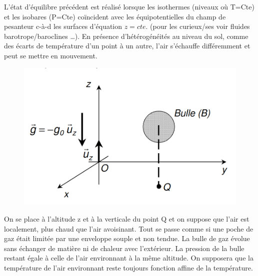 \documentclass[letterpaper]{article}
\begin{document}
L'état d'équilibre précédent est réalisé lorsque les isothermes (niveaux où T=Cte) et les isobares (P=Cte) coïncident avec les équipotentielles du champ de pesanteur c-à-d les surfaces d'équation \(z = cte\). (pour les curieux/ses voir fluides barotrope/baroclines \ldots{}). En présence d’hétérogénéités au niveau du sol, comme des écarts de température d'un point à un autre, l'air s'échauffe différemment et peut se mettre en mouvement.

\bigskip

\begin{figure}[htbp]
\centering
\includegraphics[width=.9\linewidth]{./Ex2a.png}
\end{figure}


On se place à l'altitude z et à la verticale du point Q et on suppose que l'air est localement, plus chaud que l'air avoisinant. Tout se passe comme si une poche de gaz était limitée par une enveloppe souple et non tendue. La bulle de gaz évolue sans échanger de matière ni de chaleur avec l'extérieur. La pression de la bulle restant égale à celle de l'air environnant à la même altitude. On supposera que la température de l'air environnant reste toujours fonction affine de la température.
\end{document}
